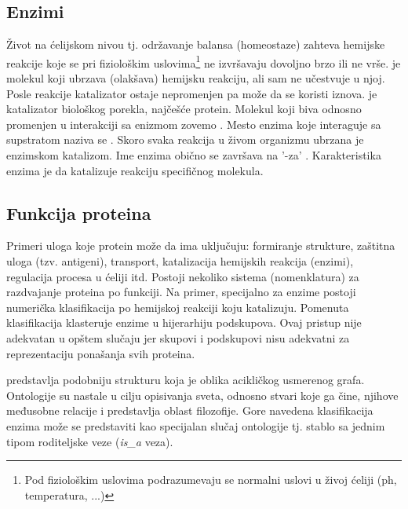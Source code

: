 
\subsection{Enzimi}

Život na ćelijskom nivou tj. održavanje balansa (homeostaze) zahteva hemijske
reakcije koje se pri fiziološkim uslovima\footnote{Pod fiziološkim uslovima
podrazumevaju se normalni uslovi u živoj ćeliji (ph, temperatura, ...)} ne
izvršavaju dovoljno brzo ili ne vrše.   je molekul koji
ubrzava (olakšava) hemijsku reakciju, ali sam ne učestvuje u njoj.  Posle
reakcije katalizator ostaje nepromenjen pa može da se koristi iznova.
 je katalizator biološkog porekla, najčešće protein.  Molekul
koji biva  odnosno promenjen u interakciji sa enizmom
zovemo . Mesto enzima koje interaguje sa supstratom naziva se
.  Skoro svaka reakcija u živom organizmu ubrzana je
enzimskom katalizom. Ime enzima obično se završava na '-za' .
Karakteristika enzima je da katalizuje reakciju specifičnog molekula.

\subsection{Funkcija proteina}

Primeri uloga koje protein može da ima uključuju: formiranje
strukture, zaštitna uloga (tzv. antigeni), transport, katalizacija hemijskih
reakcija (enzimi), regulacija procesa u ćeliji itd.  Postoji nekoliko sistema
(nomenklatura) za razdvajanje proteina po funkciji.  Na primer, specijalno za
enzime postoji numerička klasifikacija po hemijskoj reakciji koju katalizuju.
Pomenuta klasifikacija klasteruje enzime u hijerarhiju podskupova. Ovaj pristup
nije adekvatan u opštem slučaju jer skupovi i podskupovi nisu adekvatni za
reprezentaciju ponašanja svih proteina.

 predstavlja podobniju strukturu koja je oblika acikličkog
usmerenog grafa.  Ontologije su nastale u cilju opisivanja sveta, odnosno
stvari koje ga čine, njihove međusobne relacije i predstavlja oblast
filozofije.  Gore navedena klasifikacija enzima može se predstaviti kao
specijalan slučaj ontologije tj. stablo sa jednim tipom roditeljske veze
(\textit{is\_a} veza).

